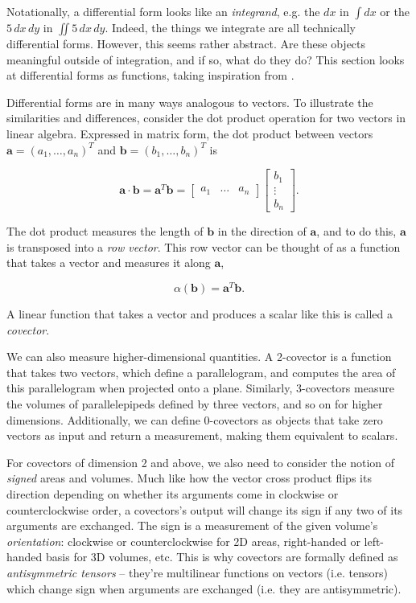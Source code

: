 \documentclass[utf8,english]{gradu3}
\begin{document}
Notationally, a differential form looks like an \textit{integrand},
e.g. the $dx$ in $\int dx$ or the $5\,dx\,dy$ in $\iint 5\,dx\,dy$.
Indeed, the things we integrate are all technically differential forms.
However, this seems rather abstract.
Are these objects meaningful outside of integration,
and if so, what do they do?
This section looks at differential forms as functions,
taking inspiration from \parencite{crane_digital_2013}.

Differential forms are in many ways analogous to vectors.
To illustrate the similarities and differences,
consider the dot product operation
for two vectors in linear algebra.
Expressed in matrix form, the dot product between vectors
$\mathbf{a} = (a_1, \dots, a_n)^T$ and $\mathbf{b} = (b_1, \dots, b_n)^T$
is

\[
  \mathbf{a} \cdot \mathbf{b} = \mathbf{a}^T \mathbf{b}
  = \begin{bmatrix}
    a_1 & \dots & a_n
  \end{bmatrix}
  \begin{bmatrix}
    b_1 \\ \vdots \\ b_n
  \end{bmatrix}.
\]

The dot product measures the length of $\mathbf{b}$ in the direction of $\mathbf{a}$,
and to do this, $\mathbf{a}$ is transposed into a \textit{row vector}.
This row vector can be thought of as a function
that takes a vector and measures it along $\mathbf{a}$,

\[
  \alpha(\mathbf{b}) = \mathbf{a}^T \mathbf{b}.
\]

A linear function that takes a vector and produces a scalar like this
is called a \textit{covector}.

We can also measure higher-dimensional quantities.
A 2-covector is a function that takes two vectors,
which define a parallelogram,
and computes the area of this parallelogram
when projected onto a plane.
Similarly, 3-covectors measure the volumes of parallelepipeds
defined by three vectors, and so on for higher dimensions.
Additionally, we can define 0-covectors
as objects that take zero vectors as input and return a measurement,
making them equivalent to scalars.

For covectors of dimension 2 and above, we also need to consider
the notion of \textit{signed} areas and volumes.
Much like how the vector cross product flips its direction
depending on whether its arguments come in clockwise or counterclockwise order,
a covectors's output will change its sign
if any two of its arguments are exchanged.
The sign is a measurement of the given volume's \textit{orientation}:
clockwise or counterclockwise for 2D areas,
right-handed or left-handed basis for 3D volumes, etc.
This is why covectors are formally defined as \textit{antisymmetric tensors}
-- they're multilinear functions on vectors (i.e. tensors)
which change sign when arguments are exchanged (i.e. they are antisymmetric).
\end{document}
